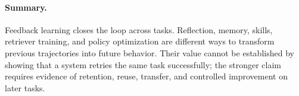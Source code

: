 \paragraph{Summary.}
Feedback learning closes the loop across tasks. Reflection, memory, skills, retriever training, and policy optimization are different ways to transform previous trajectories into future behavior. Their value cannot be established by showing that a system retries the same task successfully; the stronger claim requires evidence of retention, reuse, transfer, and controlled improvement on later tasks.
